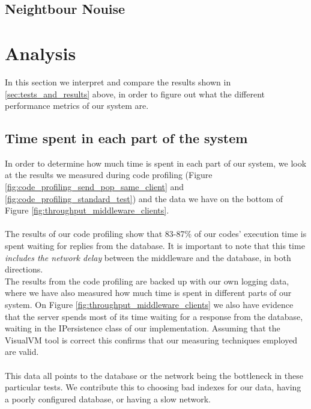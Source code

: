 \documentclass{article}
\begin{document}
        \begin{table}
            \begin{tabular}




        \subsection{Neightbour Nouise}

    \section{Analysis}
        \label{sec:analysis}
        In this section we interpret and compare the results shown in \ref{sec:tests_and_results} above, in order to figure out what the different performance metrics of our system are.

        \subsection{Time spent in each part of the system}
            \label{sec:time_spent_in_each_part_of_the_system}
            In order to determine how much time is spent in each part of our system, we look at the results we measured during code profiling (Figure \ref{fig:code_profiling_send_pop_same_client} and \ref{fig:code_profiling_standard_test}) and the data we have on the bottom of Figure \ref{fig:throughput_middleware_clients}.\\
            \\
            The results of our code profiling show that 83-87\% of our codes' execution time is spent waiting for replies from the database. It is important to note that this time \textit{includes the network delay} between the middleware and the database, in both directions.\\
            The results from the code profiling are backed up with our own logging data, where we have also measured how much time is spent in different parts of our system. On Figure \ref{fig:throughput_middleware_clients} we also have evidence that the server spends most of its time waiting for a response from the database, waiting in the IPersistence class of our implementation. Assuming that the VisualVM tool is correct this confirms that our measuring techniques employed are valid.\\
            \\
            This data all points to the database or the network being the bottleneck in these particular tests. We contribute this to choosing bad indexes for our data, having a poorly configured database, or having a slow network.


\end{tabular}
\end{table}
\end{document}
